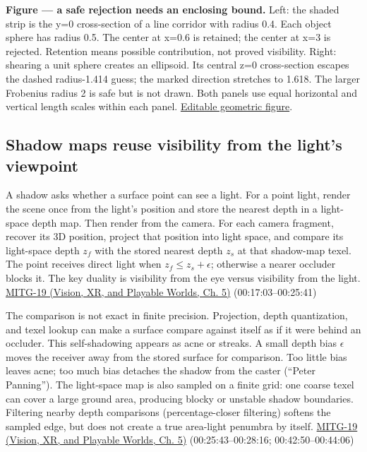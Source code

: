 \textbf{Figure --- a safe rejection needs an enclosing bound.} Left: the shaded strip is the y=0 cross-section of a line corridor with radius 0.4. Each object sphere has radius 0.5. The center at x=0.6 is retained; the center at x=3 is rejected. Retention means possible contribution, not proved visibility. Right: shearing a unit sphere creates an ellipsoid. Its central z=0 cross-section escapes the dashed radius-1.414 guess; the marked direction stretches to 1.618. The larger Frobenius radius 2 is safe but is not drawn. Both panels use equal horizontal and vertical length scales within each panel. \href{../current/Assets/Print/016860dc0184c06f711840f56b538b20ca1c1da2056933afcee968eb701078d3.svg}{Editable geometric figure}.

\subsection{Shadow maps reuse visibility from the light's viewpoint}\label{04-visual-computing-ii-ch028-shadow-maps-reuse-visibility-from-the-lights-viewpoint}

A shadow asks whether a surface point can see a light. For a point light, render the scene once from the light's position and store the nearest depth in a light-space depth map. Then render from the camera. For each camera fragment, recover its 3D position, project that position into light space, and compare its light-space depth \(z_f\) with the stored nearest depth \(z_s\) at that shadow-map texel. The point receives direct light when \(z_f\le z_s+\epsilon\); otherwise a nearer occluder blocks it. The key duality is visibility from the eye versus visibility from the light. \href{../07-Vision-XR-and-Playable-Worlds/main.pdf\#nameddest=04-visual-computing-ii-ch036-mitg-19---shadow-maps}{MITG-19 (Vision, XR, and Playable Worlds, Ch. 5)} (00:17:03--00:25:41)

The comparison is not exact in finite precision. Projection, depth quantization, and texel lookup can make a surface compare against itself as if it were behind an occluder. This self-shadowing appears as acne or streaks. A small depth bias \(\epsilon\) moves the receiver away from the stored surface for comparison. Too little bias leaves acne; too much bias detaches the shadow from the caster (``Peter Panning''). The light-space map is also sampled on a finite grid: one coarse texel can cover a large ground area, producing blocky or unstable shadow boundaries. Filtering nearby depth comparisons (percentage-closer filtering) softens the sampled edge, but does not create a true area-light penumbra by itself. \href{../07-Vision-XR-and-Playable-Worlds/main.pdf\#nameddest=04-visual-computing-ii-ch036-mitg-19---shadow-maps}{MITG-19 (Vision, XR, and Playable Worlds, Ch. 5)} (00:25:43--00:28:16; 00:42:50--00:44:06)

